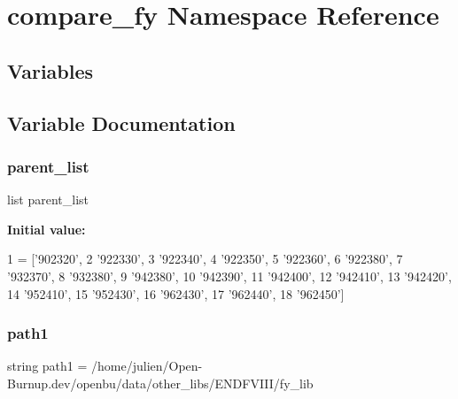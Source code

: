 \hypertarget{namespacecompare__fy}{}\section{compare\+\_\+fy Namespace Reference}
\label{namespacecompare__fy}
\subsection*{Variables}


\subsection{Variable Documentation}
\mbox{\label{namespacecompare__fy_aa6c604671439900baff8596e2e684256}} 
\subsubsection{\texorpdfstring{parent\+\_\+list}{parent\_list}}
{\footnotesize\ttfamily list parent\+\_\+list}

{\bfseries Initial value\+:}
\begin{DoxyCode}
1 =  [\textcolor{stringliteral}{'902320'},
2 \textcolor{stringliteral}{'922330'},
3 \textcolor{stringliteral}{'922340'},
4 \textcolor{stringliteral}{'922350'},
5 \textcolor{stringliteral}{'922360'},
6 \textcolor{stringliteral}{'922380'},
7 \textcolor{stringliteral}{'932370'},
8 \textcolor{stringliteral}{'932380'},
9 \textcolor{stringliteral}{'942380'},
10 \textcolor{stringliteral}{'942390'},
11 \textcolor{stringliteral}{'942400'},
12 \textcolor{stringliteral}{'942410'},
13 \textcolor{stringliteral}{'942420'},
14 \textcolor{stringliteral}{'952410'},
15 \textcolor{stringliteral}{'952430'},
16 \textcolor{stringliteral}{'962430'},
17 \textcolor{stringliteral}{'962440'},
18 \textcolor{stringliteral}{'962450'}]
\end{DoxyCode}
\mbox{\label{namespacecompare__fy_a81e345d1e80f03db12b67f5888f47849}} 
\subsubsection{\texorpdfstring{path1}{path1}}
{\footnotesize\ttfamily string path1 = \textquotesingle{}/home/julien/Open-\/Burnup.\+dev/openbu/data/other\+\_\+libs/E\+N\+D\+F\+V\+I\+II/fy\+\_\+lib\textquotesingle{}}

